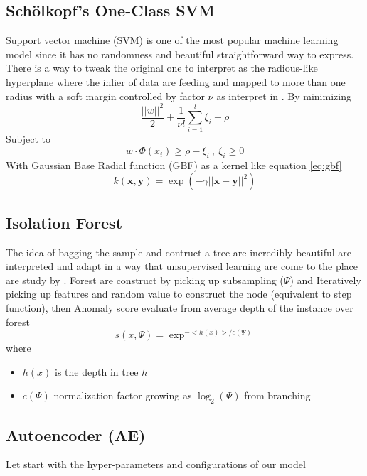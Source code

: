 \subsection{Sch\"{o}lkopf's One-Class SVM}
Support vector machine (SVM) is one of the most popular machine learning model since it has no randomness and beautiful straightforward way to express.
There is a way to tweak the original one to interpret as the radious-like hyperplane where the inlier of data are feeding and mapped to more than one radius with a soft margin controlled by factor $\nu$ as interpret in \cite{oneclasssvm}.
By minimizing
\begin{equation}
\frac{||w||^2}{2} + \frac{1}{\nu l}\sum_{i=1}^l \xi_i - \rho
\end{equation}
Subject to
\begin{equation}
    w \cdot \Phi(x_i) \geqslant \rho - \xi_i \ ,\ \xi_i \geqslant 0
\end{equation}
With Gaussian Base Radial function (GBF) as a kernel like equation \ref{eq:gbf}
\begin{equation}\label{eq:gbf}
    k(\mathbf{x}, \mathbf{y}) = \exp(-\gamma||\mathbf{x} - \mathbf{y}||^2)
\end{equation}

\subsection{Isolation Forest}
The idea of bagging the sample and contruct a tree are incredibly beautiful are interpreted and adapt in a way that unsupervised learning are come to the place are study by \cite{isolation_forest}.
Forest are construct by picking up subsampling ($\Psi$) and Iteratively picking up features and random value to construct the node (equivalent to step function), then Anomaly score evaluate from average depth of the instance over forest
\begin{equation}
    s(x, \Psi) = \exp^{-<h(x)>/c(\Psi)}
\end{equation} 
where
\begin{itemize}
    \item $h(x)$ is the depth in tree $h$
    \item $c(\Psi)$ normalization factor growing as $\log_2(\Psi)$ from branching
\end{itemize}

\subsection{Autoencoder (AE)}
Let start with the hyper-parameters and configurations of our model
